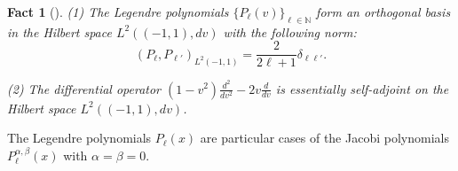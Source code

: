 \documentclass[12pt,leqno]{amsart}
\theoremstyle{plain}
\newtheorem{fact}[thm]{Fact}
\theoremstyle{definition}
\begin{document}
\begin{fact}
[{\cite{xLe785, xSrMa84}}]
\label{fact:legendre}
{\rm{(1)}}\enspace
The Legendre polynomials 
 $\{P_{\ell}(v)\}_{\ell \in {\mathbb{N}}}$ form 
 an orthogonal basis
 in the Hilbert space $L^2((-1,1), d v)$
 with the following norm:
\[
 (P_{\ell}, P_{\ell'})_{L^2(-1,1)} = \frac 2 {2\ell+1} \delta_{\ell\ell'}.  
\]


\par\noindent
{\rm{(2)}}\enspace
The differential operator $(1-v^2)\frac{d^2}{dv^2}-2v\frac{d}{dv}$
 is essentially self-adjoint 
 on the Hilbert space $L^2((-1,1), d v)$.  
\end{fact}

The Legendre polynomials $P_{\ell}(x)$ are particular cases of the Jacobi polynomials
 $P_{\ell}^{\alpha, \beta}(x)$
 with $\alpha=\beta=0$.  
\end{document}
